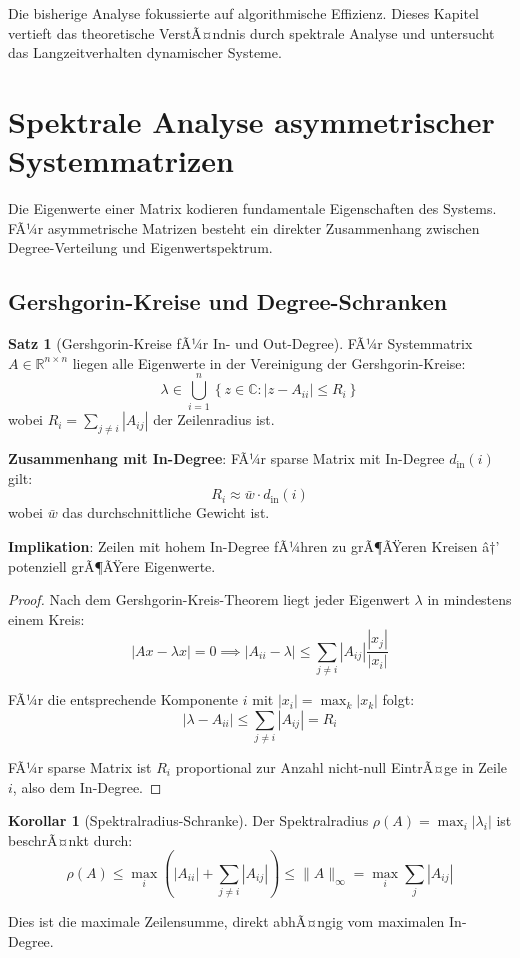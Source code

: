 ﻿\documentclass[a4paper,12pt]{report}
\theoremstyle{definition}
\newtheorem{satz}{Satz}
\newtheorem{korollar}{Korollar}
\begin{document}
	Die bisherige Analyse fokussierte auf algorithmische Effizienz. Dieses Kapitel vertieft das theoretische VerstÃ¤ndnis durch spektrale Analyse und untersucht das Langzeitverhalten dynamischer Systeme.
	
	\section{Spektrale Analyse asymmetrischer Systemmatrizen}
	
	Die Eigenwerte einer Matrix kodieren fundamentale Eigenschaften des Systems. FÃ¼r asymmetrische Matrizen besteht ein direkter Zusammenhang zwischen Degree-Verteilung und Eigenwertspektrum.
	
	\subsection{Gershgorin-Kreise und Degree-Schranken}
	
	\begin{satz}[Gershgorin-Kreise fÃ¼r In- und Out-Degree]
		FÃ¼r Systemmatrix $A \in \mathbb{R}^{n \times n}$ liegen alle Eigenwerte in der Vereinigung der Gershgorin-Kreise:
		\[
		\lambda \in \bigcup_{i=1}^n \left\{ z \in \mathbb{C} : |z - A_{ii}| \leq R_i \right\}
		\]
		wobei $R_i = \sum_{j \neq i} |A_{ij}|$ der Zeilenradius ist.
		
		\textbf{Zusammenhang mit In-Degree}:
		FÃ¼r sparse Matrix mit In-Degree $d_{\text{in}}(i)$ gilt:
		\[
		R_i \approx \bar{w} \cdot d_{\text{in}}(i)
		\]
		wobei $\bar{w}$ das durchschnittliche Gewicht ist.
		
		\textbf{Implikation}: Zeilen mit hohem In-Degree fÃ¼hren zu grÃ¶ÃŸeren Kreisen â†’ potenziell grÃ¶ÃŸere Eigenwerte.
	\end{satz}
	
	\begin{proof}
		Nach dem Gershgorin-Kreis-Theorem liegt jeder Eigenwert $\lambda$ in mindestens einem Kreis:
		\[
		|Ax - \lambda x| = 0 \implies |A_{ii} - \lambda| \leq \sum_{j \neq i} |A_{ij}| \frac{|x_j|}{|x_i|}
		\]
		
		FÃ¼r die entsprechende Komponente $i$ mit $|x_i| = \max_k |x_k|$ folgt:
		\[
		|\lambda - A_{ii}| \leq \sum_{j \neq i} |A_{ij}| = R_i
		\]
		
		FÃ¼r sparse Matrix ist $R_i$ proportional zur Anzahl nicht-null EintrÃ¤ge in Zeile $i$, also dem In-Degree.
	\end{proof}
	
	\begin{korollar}[Spektralradius-Schranke]
		Der Spektralradius $\rho(A) = \max_i |\lambda_i|$ ist beschrÃ¤nkt durch:
		\[
		\rho(A) \leq \max_i \left( |A_{ii}| + \sum_{j \neq i} |A_{ij}| \right) \leq \|A\|_{\infty} = \max_i \sum_j |A_{ij}|
		\]
		
		Dies ist die maximale Zeilensumme, direkt abhÃ¤ngig vom maximalen In-Degree.
	\end{korollar}
	
\end{document}
